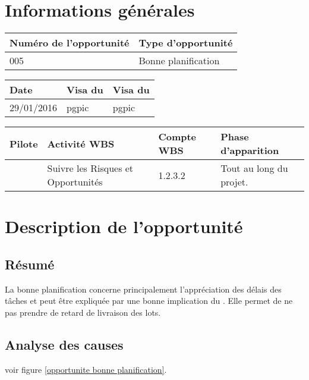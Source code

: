 
\section*{Informations générales}
 
\begin{table}[h]
\centering
	\begin{tabularx}{16.8cm}{|X|X|}
	\hline
	\rowcolor{gray!40} Numéro de l'opportunité & Type d'opportunité \\
	\hline
	005 & Bonne planification \\
	\hline
	\end{tabularx}
\end{table}

\begin{table}[h]
\centering
	\begin{tabularx}{16.8cm}{|X|X|X|}
	\hline
	\rowcolor{gray!40} Date & Visa du \RQ & Visa du \CP \\
	\hline
	 29/01/2016 & pgpic & pgpic \\
	\hline
	\end{tabularx}
\end{table}

\begin{table}[h]
\centering
	\begin{tabularx}{16.8cm}{|X|X|X|X|}
	\hline
	\rowcolor{gray!40} Pilote & Activité WBS & Compte WBS & Phase d'apparition \\
	\hline
	 \Pierre & Suivre les Risques et Opportunités & 1.2.3.2 & Tout au long du projet.\\
	\hline
	\end{tabularx}
\end{table}

\section*{Description de l'opportunité}

\subsection*{Résumé}

	La bonne planification concerne principalement l’appréciation des délais des tâches
et peut être expliquée par une bonne implication du \CP. Elle permet de ne pas prendre de retard de
livraison des lots.
	
\subsection*{Analyse des causes}
	voir figure \ref{opportunite bonne planification}.

